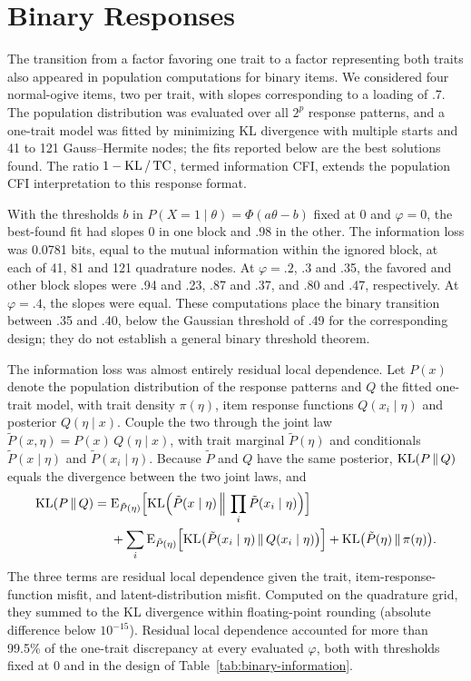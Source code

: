 \section{Binary Responses}
\label{app:binary}
\label{sec:binary}

The transition from a factor favoring one trait to a factor representing both traits also appeared in population computations for binary items. We considered four normal-ogive items, two per trait, with slopes corresponding to a loading of .7. The population distribution was evaluated over all $2^p$ response patterns, and a one-trait model was fitted by minimizing KL divergence with multiple starts and 41 to 121 Gauss--Hermite nodes; the fits reported below are the best solutions found. The ratio $1-\operatorname{KL}/\operatorname{TC}$, termed information CFI, extends the population CFI interpretation to this response format.

With the thresholds $b$ in $P(X=1\mid\theta)=\Phi(a\theta-b)$ fixed at 0 and $\varphi=0$, the best-found fit had slopes 0 in one block and .98 in the other. The information loss was 0.0781 bits, equal to the mutual information within the ignored block, at each of 41, 81 and 121 quadrature nodes. At $\varphi=.2$, .3 and .35, the favored and other block slopes were .94 and .23, .87 and .37, and .80 and .47, respectively. At $\varphi=.4$, the slopes were equal. These computations place the binary transition between .35 and .40, below the Gaussian threshold of .49 for the corresponding design; they do not establish a general binary threshold theorem.

The information loss was almost entirely residual local dependence. Let $P(x)$ denote the population distribution of the response patterns and $Q$ the fitted one-trait model, with trait density $\pi(\eta)$, item response functions $Q(x_i\mid\eta)$ and posterior $Q(\eta\mid x)$. Couple the two through the joint law $\tilde P(x,\eta)=P(x)\,Q(\eta\mid x)$, with trait marginal $\tilde P(\eta)$ and conditionals $\tilde P(x\mid\eta)$ and $\tilde P(x_i\mid\eta)$. Because $\tilde P$ and $Q$ have the same posterior, $\operatorname{KL}(P\,\|\,Q)$ equals the divergence between the two joint laws, and
\begin{align*}
\operatorname{KL}(P\,\|\,Q)
={}&\mathrm{E}_{\tilde P(\eta)}\Bigl[\operatorname{KL}\Bigl(\tilde P(x\mid\eta)\,\Big\|\,\prod_{i}\tilde P(x_i\mid\eta)\Bigr)\Bigr]\\
&+\sum_{i}\mathrm{E}_{\tilde P(\eta)}\Bigl[\operatorname{KL}\bigl(\tilde P(x_i\mid\eta)\,\|\,Q(x_i\mid\eta)\bigr)\Bigr]
+\operatorname{KL}\bigl(\tilde P(\eta)\,\|\,\pi(\eta)\bigr).
\end{align*}
The three terms are residual local dependence given the trait, item-response-function misfit, and latent-distribution misfit. Computed on the quadrature grid, they summed to the KL divergence within floating-point rounding (absolute difference below $10^{-15}$). Residual local dependence accounted for more than 99.5\% of the one-trait discrepancy at every evaluated $\varphi$, both with thresholds fixed at 0 and in the design of Table~\ref{tab:binary-information}.

